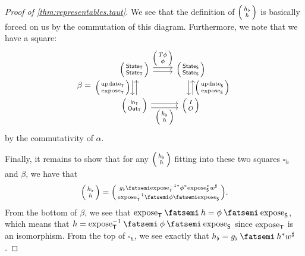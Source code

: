 \documentclass[DynamicalBook]{subfiles}
\begin{document}
\begin{proof}[Proof of \cref{thm:representables.taut}]
 We see that the definition of $\lens{h_{\flat}}{h}$ is basically forced on us
 by the commutation of this diagram. Furthermore, we note that we have a square:
 \[
\beta =    \begin{tikzcd}[ampersand replacement = \&]
      \lens{\State{T}}{\State{T}} \ar[r, shift left,  "\lens{T\phi}{\phi}"] \ar[r,  shift right] \ar[d, shift right,
      "\lens{\update{T}}{\expose{T}}"'] \ar[d, shift left, leftarrow] \&
      \lens{\State{S}}{\State{S}} \ar[d, shift left, leftarrow,
      "\lens{\update{S}}{\expose{S}}"] \ar[d, shift right]\\
      \lens{\In{T}}{\Out{T}} \ar[r, shift right, "\lens{h_{\flat}}{h}"'] \ar[r,
      shift left] \& \lens{I}{O}
    \end{tikzcd} 
\]
by the commutativity of $\alpha$.

Finally, it remains to show that for any $\lens{h_{\flat}}{h}$ fitting into
these two squares $\square_h$ and $\beta$, we have that
\[
\lens{h_{\flat}}{h} = \lens{g_{\flat} \then
  \expose{T}^{-1\ast}\phi^{\ast}\expose{S}^{\ast}w^{\sharp}}{\expose{T}\inv
  \then \phi \then \expose{S}} .
\]
From the bottom of $\beta$, we see that $\expose{T} \then h = \phi \then \expose{S}$, which means that $h = \expose{T}\inv \then \phi \then \expose{S}$ since $\mathrm{expose}_{\mathsf{T}}$ is an isomorphism. From the top of $\square_h$, we see
exactly that $h_{\flat} = g_{\flat} \then h^{\ast} w^{\sharp}$.
\end{proof}
\end{document}
